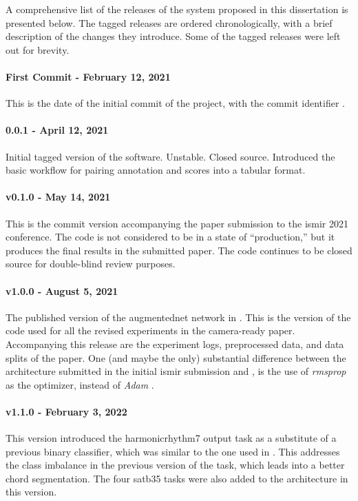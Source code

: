 
A comprehensive list of the releases of the system proposed
in this dissertation is presented below. The tagged releases
are ordered chronologically, with a brief description of the
changes they introduce. Some of the tagged releases were
left out for brevity.

\paragraph{First Commit - February 12, 2021}
This is the date of the initial commit of the project, with
the commit identifier .

\paragraph{0.0.1 - April 12, 2021}
Initial tagged version of the software. Unstable. Closed
source. Introduced the basic workflow for pairing annotation
and scores into a tabular format.

\paragraph{v0.1.0 - May 14, 2021}
This is the commit version accompanying the paper submission
to the \gls{ismir} 2021 conference. The code is not
considered to be in a state of ``production,'' but it
produces the final results in the submitted paper. The code
continues to be closed source for double-blind review
purposes.

\paragraph{v1.0.0 - August 5, 2021}
The published version of the \gls{augmentednet} network in
\textcite{napoleslopez2021augmentednet}. This is the version
of the code used for all the revised experiments in the
camera-ready paper. Accompanying this release are the
experiment logs, preprocessed data, and data splits of the
paper. One (and maybe the only) substantial difference
between the architecture submitted in the initial
\gls{ismir} submission and , is the use of
\emph{rmsprop} as the optimizer, instead of \emph{Adam}
\parencite{kingma2014adam}. 

\paragraph{v1.1.0 - February 3, 2022}
This version introduced the \gls{harmonicrhythm7} output
task as a substitute of a previous binary classifier, which
was similar to the one used in \textcite{chen2021attend}.
This addresses the class imbalance in the previous version
of the task, which leads into a better chord segmentation.
The four \gls{satb35} tasks were also added to the
architecture in this version.

